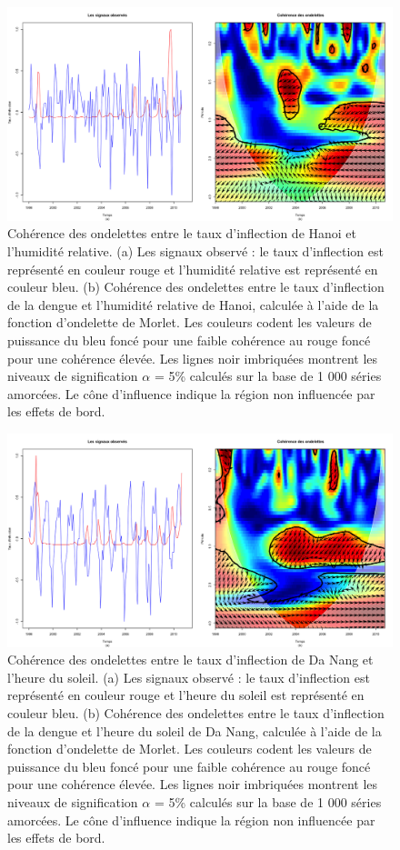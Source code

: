 \begin{figure}[h]
\includegraphics[width = \linewidth]{../figures/chap4/Pic4_3.png}
\caption{Cohérence des ondelettes entre le taux d'inflection de Hanoi et l'humidité relative. 
(a) Les signaux observé : le taux d'inflection est représenté en couleur rouge et l'humidité relative est représenté en couleur bleu.
(b) Cohérence des ondelettes entre le taux d'inflection de la dengue et l'humidité relative de Hanoi, calculée à l'aide de la fonction d'ondelette de Morlet. Les couleurs codent les valeurs de puissance du bleu foncé pour une faible cohérence au rouge foncé pour une cohérence élevée. Les lignes noir imbriquées montrent les niveaux de signification $\alpha$ = 5\% calculés sur la base de 1 000 séries amorcées. Le cône d'influence indique la région non influencée par les effets de bord. }
\label{Pic4_3}	
\end{figure}

\begin{figure}[h]
\includegraphics[width = \linewidth]{../figures/chap4/Pic4_4.png}
\caption{Cohérence des ondelettes entre le taux d'inflection de Da Nang et l'heure du soleil. 
(a) Les signaux observé : le taux d'inflection est représenté en couleur rouge et l'heure du soleil est représenté en couleur bleu.
(b) Cohérence des ondelettes entre le taux d'inflection de la dengue et l'heure du soleil de Da Nang, calculée à l'aide de la fonction d'ondelette de Morlet. Les couleurs codent les valeurs de puissance du bleu foncé pour une faible cohérence au rouge foncé pour une cohérence élevée. Les lignes noir imbriquées montrent les niveaux de signification $\alpha$ = 5\% calculés sur la base de 1 000 séries amorcées. Le cône d'influence indique la région non influencée par les effets de bord. }
\label{Pic4_4}	
\end{figure}

